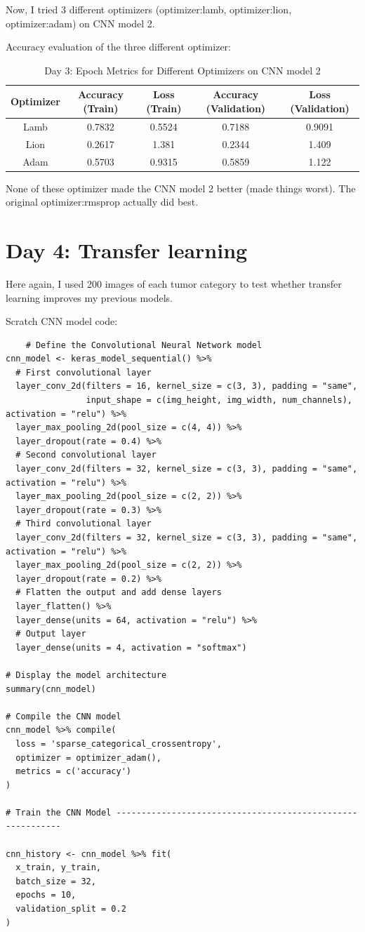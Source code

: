 \documentclass[letterpaper,11pt]{article}
\begin{document}
Now, I tried 3 different optimizers (optimizer:lamb, optimizer:lion, optimizer:adam) on CNN model 2.

Accuracy evaluation of the three different optimizer:
\begin{table}[h!]
    \centering
    \begin{tabular}{|c|c|c|c|c|}
        \hline
        \textbf{Optimizer} & \textbf{Accuracy (Train)} & \textbf{Loss (Train)} & \textbf{Accuracy (Validation)} & \textbf{Loss (Validation)} \\ \hline
        Lamb & 0.7832 & 0.5524 & 0.7188 & 0.9091 \\ \hline
        Lion & 0.2617 & 1.381 & 0.2344 & 1.409 \\ \hline
        Adam & 0.5703 & 0.9315 & 0.5859 & 1.122 \\ \hline
    \end{tabular}
    \caption{Day 3: Epoch Metrics for Different Optimizers on CNN model 2}
    \label{tab:optimizer_metrics}
\end{table}

None of these optimizer made the CNN model 2 better (made things worst). The original optimizer:rmsprop actually did best.

\section{Day 4: Transfer learning}
Here again, I used 200 images of each tumor category to test whether transfer learning improves my previous models.

Scratch CNN model code:
\begin{verbatim}
    # Define the Convolutional Neural Network model
cnn_model <- keras_model_sequential() %>%
  # First convolutional layer
  layer_conv_2d(filters = 16, kernel_size = c(3, 3), padding = "same", 
                input_shape = c(img_height, img_width, num_channels), activation = "relu") %>%
  layer_max_pooling_2d(pool_size = c(4, 4)) %>%
  layer_dropout(rate = 0.4) %>%
  # Second convolutional layer
  layer_conv_2d(filters = 32, kernel_size = c(3, 3), padding = "same", activation = "relu") %>%
  layer_max_pooling_2d(pool_size = c(2, 2)) %>%
  layer_dropout(rate = 0.3) %>%
  # Third convolutional layer
  layer_conv_2d(filters = 32, kernel_size = c(3, 3), padding = "same", activation = "relu") %>%
  layer_max_pooling_2d(pool_size = c(2, 2)) %>%
  layer_dropout(rate = 0.2) %>%
  # Flatten the output and add dense layers
  layer_flatten() %>%
  layer_dense(units = 64, activation = "relu") %>%
  # Output layer
  layer_dense(units = 4, activation = "softmax")

# Display the model architecture
summary(cnn_model)  

# Compile the CNN model
cnn_model %>% compile(
  loss = 'sparse_categorical_crossentropy',
  optimizer = optimizer_adam(),
  metrics = c('accuracy')
)

# Train the CNN Model -----------------------------------------------------------

cnn_history <- cnn_model %>% fit(
  x_train, y_train,
  batch_size = 32,
  epochs = 10, 
  validation_split = 0.2
)
\end{verbatim}
\end{document}
